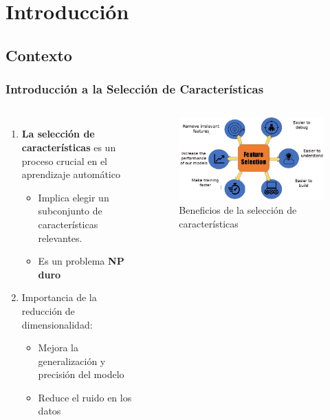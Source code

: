 \section{Introducción}

\subsection{Contexto}
\begin{frame}
  \frametitle{Introducción a la Selección de Características}
  \begin{columns}
    \begin{enumerate}
      \item \textbf{La selección de características} es un proceso crucial en el aprendizaje automático
            \begin{itemize}
              \item Implica elegir un subconjunto de características relevantes.
              \item Es un problema \textbf{NP duro}
            \end{itemize}
            \item{Importancia de la reducción de dimensionalidad}:
            \begin{itemize}
              \item Mejora la generalización y precisión del modelo
              \item Reduce el ruido en los datos
            \end{itemize}
    \end{enumerate}
    \begin{figure}
      \begin{center}
        \includegraphics[width=\textwidth]{imagenes/chapter1/feature_selection_pros-removebg-preview.png}
      \end{center}
      \caption{Beneficios de la selección de características}
    \end{figure}
  \end{columns}
  \vspace{-.2cm}
\end{frame}

